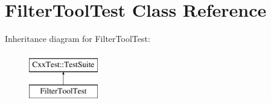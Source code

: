 \hypertarget{classFilterToolTest}{\section{Filter\-Tool\-Test Class Reference}
\label{classFilterToolTest}
}
Inheritance diagram for Filter\-Tool\-Test\-:\begin{figure}[H]
\begin{center}
\leavevmode
\includegraphics[height=2.000000cm]{classFilterToolTest}
\end{center}
\end{figure}
